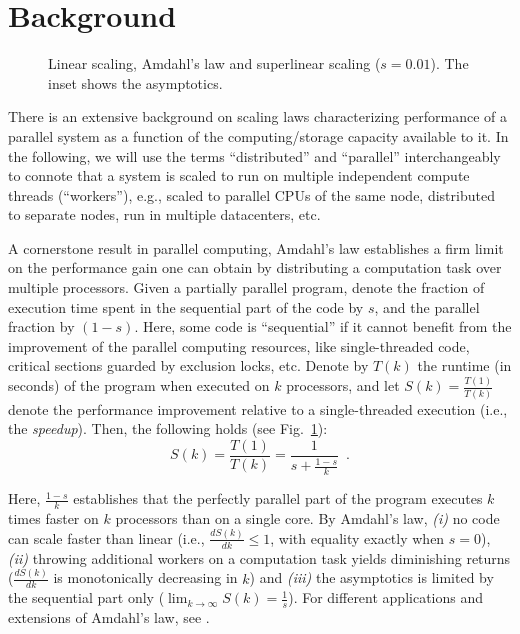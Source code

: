 \section{Background}\label{sec:background}

\begin{figure}[t]
  \centering
  \begin{small}
    
  \end{small}
  \caption{Linear scaling, Amdahl's law and superlinear scaling ($s=0.01$). The inset shows the asymptotics.}
    \label{fig:amdahl}
\end{figure}

There is an extensive background on scaling laws characterizing performance of a parallel system as a function of the computing\slash storage capacity available to it. In the following, we will use the terms ``distributed'' and ``parallel'' interchangeably to connote that a system is scaled to run on multiple independent compute threads (``workers''), e.g., scaled to parallel CPUs of the same node, distributed to separate nodes, run in multiple datacenters, etc.

A cornerstone result in parallel computing, Amdahl's law \cite{10.1145/1465482.1465560} establishes a firm limit on the performance gain one can obtain by distributing a computation task over multiple processors. Given a partially parallel program, denote the fraction of execution time spent in the sequential part of the code by $s$, and the parallel fraction by $(1-s)$. Here, some code is ``sequential'' if it cannot benefit from the improvement of the parallel computing resources, like single-threaded code, critical sections guarded by exclusion locks, etc. Denote by $T(k)$ the runtime (in seconds) of the program when executed on $k$ processors, and let $S(k)=\frac{T(1)}{T(k)}$ denote the performance improvement relative to a single-threaded execution (i.e., the \emph{speedup}). Then, the following holds (see Fig.~\ref{fig:amdahl}):
\begin{equation}\label{eq:amdahl}
S(k) = \frac{T(1)}{T(k)} = \frac{1}{s + \frac{1-s}{k}} \enspace .
\end{equation}

Here, $\frac{1-s}{k}$ establishes that the perfectly parallel part of the program executes $k$ times faster on $k$ processors than on a single core. By Amdahl's law, \emph{(i)} no code can scale faster than linear (i.e., $\frac{d S(k)}{d k} \le 1$, with equality exactly when $s=0$), \emph{(ii)} throwing additional workers on a computation task yields diminishing returns ($\frac{d S(k)}{d k}$ is monotonically decreasing in $k$) and \emph{(iii)} the asymptotics is limited by the sequential part only ($\lim_{k\to \infty}S(k) = \frac1{s}$). For different applications and extensions of Amdahl's law, see \cite{4563876, 6280307,1580395,406581,6163449, 10.5555/1951599}.

